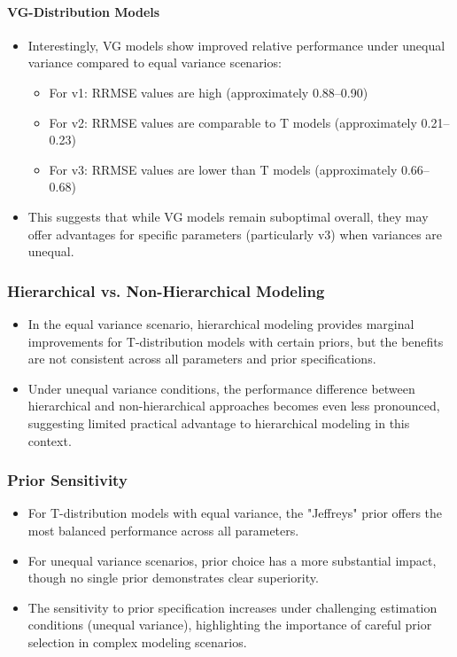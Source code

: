 \documentclass[10.5pt]{article} %
\begin{document}
\paragraph{VG-Distribution Models}
\begin{itemize}
    \item Interestingly, VG models show improved relative performance under unequal variance compared to equal variance scenarios:
    \begin{itemize}
        \item For v1: RRMSE values are high (approximately 0.88–0.90)
        \item For v2: RRMSE values are comparable to T models (approximately 0.21–0.23)
        \item For v3: RRMSE values are lower than T models (approximately 0.66–0.68)
    \end{itemize}
    \item This suggests that while VG models remain suboptimal overall, they may offer advantages for specific parameters (particularly v3) when variances are unequal.
\end{itemize}

\subsubsection{Hierarchical vs. Non-Hierarchical Modeling}
\begin{itemize}
    \item In the equal variance scenario, hierarchical modeling provides marginal improvements for T-distribution models with certain priors, but the benefits are not consistent across all parameters and prior specifications.
    \item Under unequal variance conditions, the performance difference between hierarchical and non-hierarchical approaches becomes even less pronounced, suggesting limited practical advantage to hierarchical modeling in this context.
\end{itemize}

\subsubsection{Prior Sensitivity}
\begin{itemize}
    \item For T-distribution models with equal variance, the "Jeffreys" prior offers the most balanced performance across all parameters.
    \item For unequal variance scenarios, prior choice has a more substantial impact, though no single prior demonstrates clear superiority.
    \item The sensitivity to prior specification increases under challenging estimation conditions (unequal variance), highlighting the importance of careful prior selection in complex modeling scenarios.
\end{itemize}
\end{document}
